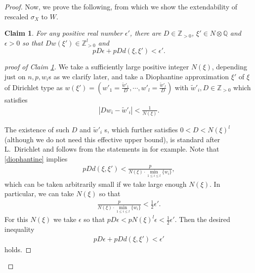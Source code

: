 \documentclass[12pt,a4paper]{amsart}
\newtheorem{Claim}[Thm]{Claim}
\theoremstyle{remark}
\theoremstyle{definition}
\def\Z{\mathbb{Z}}
\def\Q{\mathbb{Q}}
\begin{document}
\begin{proof}
Now, we prove the following, from which we show 
the extendability of rescaled $\sigma_X$ to $W$. 
\begin{Claim}\label{claim:dio}
For any positive real number 
$\epsilon'$, %
there are 
$D\in \Z_{>0}$, $\xi'\in N\otimes \Q$ 
and $\epsilon>0$ so that $Dw(\xi') \in \Z^l_{>0}$ and 
$$pD\epsilon + pDd(\xi, \xi') < \epsilon'.$$ 
\end{Claim}
\begin{proof}[proof of Claim \ref{claim:dio}]
We take a sufficiently large positive integer $N(\xi)$, 
depending just on $n,p,w_i$s as we clarify later, 
and 
take a Diophantine approximation $\xi'$ of $\xi$ 
of Dirichlet type 
as 
$w(\xi')=(w'_1=\frac{\tilde{w}'_1}{D},\cdots,w'_l=\frac{\tilde{w}'_l}{D})$ 
with $\tilde{w}'_i, D\in \Z_{>0}$ which satisfies 
\begin{align}\label{diophantine}
|Dw_i-\tilde{w}'_i|<\frac{1}{N(\xi)}. 
\end{align}

The existence of such $D$ and $\tilde{w}'_i$ s, which further satisfies $0<D<N(\xi)^l$ (although we do not need this effective
upper bound), is 
standard after L.~Dirichlet and follows from
the statements in \cite[Theorem 1A, (1.1) 
Chapter II]{Schmid} for example.  
Note that \eqref{diophantine} implies 
\begin{align}\label{diophantine2}
pDd(\xi, \xi')<\frac{p}{N(\xi)\cdot \underset{1\le i\le l}\min\{w_i\}}, 
\end{align}
which can be taken arbitrarily small if we take large enough $N(\xi)$. 
In particular, we can take $N(\xi)$ so that 
\begin{align}\label{N.exp}
\frac{p}{N(\xi)\cdot \underset{1\le i\le l}\min\{w_i\}} < \frac{1}{2}\epsilon'.
\end{align}
For this $N(\xi)$ we take $\epsilon$ so that 
$pD\epsilon<pN(\xi)^l\epsilon < \frac{1}{2}\epsilon'$. 
Then the desired inequality 
\begin{align}\label{diophantine3}
    pD\epsilon + pDd(\xi, \xi') < \epsilon'
\end{align}
holds. 
\end{proof}



\end{proof}
\end{document}
